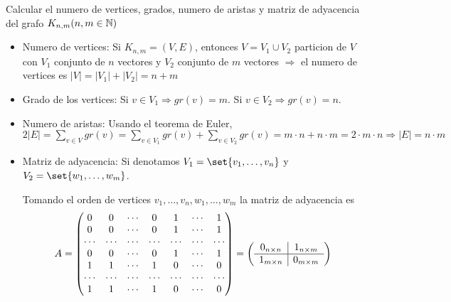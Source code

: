 \begin{example}
	Calcular el numero de vertices, grados, numero de aristas y matriz de adyacencia del grafo \(K_{n,m} (n,m \in \mathbb{N} )\)
	
	\begin{itemize}
		\item Numero de vertices: Si \(K_{n,m} = (V,E )\), entonces \(V = V_1 \cup V_2\) particion de \(V \) con \(V_1 \) conjunto de \(n \) vectores y \(V_2\) conjunto de \(m \) vectores \(\Rightarrow \) el numero de vertices es \(|V| = |V_1| + |V_2| = n + m \)
		\item Grado de los vertices: Si \(v \in V_1 \Rightarrow gr(v) = m \). Si \(v \in V_2 \Rightarrow gr(v) = n \).
		\item Numero de aristas: Usando el teorema de Euler, \(2|E| = \sum_{v \in V} gr(v) = \sum_{v \in V_1} gr(v) + \sum_{v \in V_2} gr(v) = m \cdot n + n \cdot m = 2 \cdot m \cdot n \Rightarrow |E| = n \cdot m   \)
		\item Matriz de adyacencia: Si denotamos \(V_1 = \set{v_1,\ldots,v_n}\) y \(V_2 = \set{w_1,\ldots,w_m}\).
		      
		      Tomando el orden de vertices \(v_1,\ldots,v_n,w_1,\ldots,w_m \) la matriz de adyacencia es
		      \[
			      A = \begin{pmatrix}
				      0      & 0      & \cdots & 0      & 1      & \cdots & 1      \\
				      0      & 0      & \cdots & 0      & 1      & \cdots & 1      \\
				      \cdots & \cdots & \cdots & \cdots & \cdots & \cdots & \cdots \\
				      0      & 0      & \cdots & 0      & 1      & \cdots & 1      \\
				      1      & 1      & \cdots & 1      & 0      & \cdots & 0      \\
				      \cdots & \cdots & \cdots & \cdots & \cdots & \cdots & \cdots \\
				      1      & 1      & \cdots & 1      & 0      & \cdots & 0      \\
			      \end{pmatrix} =
			      \left ( \begin{array}[pos]{c|c}
					      0_{n\times n }  & 1_{n \times m } \\ \hline
					      1_{m \times n } & 0_{m \times m}  \\
				      \end{array} \right )
		      \]
	\end{itemize}
\end{example}

